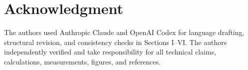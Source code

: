 \section*{Acknowledgment}
The authors used Anthropic Claude and OpenAI Codex for language drafting, structural revision, and consistency checks in Sections I--VI. The authors independently verified and take responsibility for all technical claims, calculations, measurements, figures, and references.
